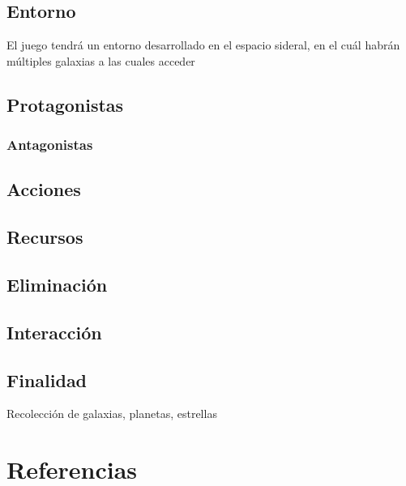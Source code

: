 \documentclass{article}
\begin{document}
\subsection{Entorno}
El juego tendrá un entorno desarrollado en el espacio sideral, en el cuál habrán múltiples galaxias a las cuales acceder
\subsection{Protagonistas}

\subsubsection{Antagonistas}

\subsection{Acciones}

\subsection{Recursos}

\subsection{Eliminación}

\subsection{Interacción}

\subsection{Finalidad}
Recolección de galaxias, planetas, estrellas
\newpage
\section{Referencias}


\cite{calistenia}
\end{document}

